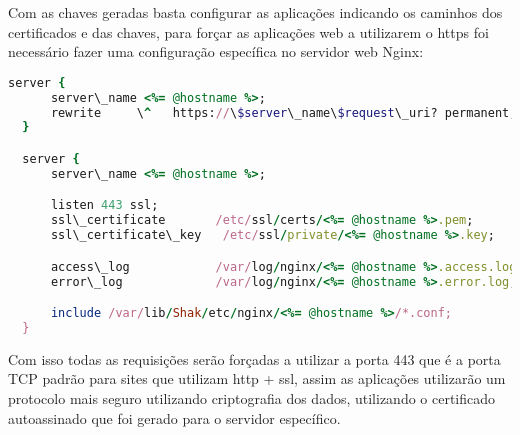Com as chaves geradas basta configurar as aplicações indicando os caminhos dos certificados
e das chaves, para forçar as aplicações web a utilizarem o https foi necessário fazer
uma configuração específica no servidor web Nginx:


\begin{lstlisting}[language=Ruby,label=dice_index,caption={Exemplo de arquivo de configuração do Nginx para aplicações web no shak}]
  server {
      server\_name <%= @hostname %>;
      rewrite     \^   https://\$server\_name\$request\_uri? permanent;
  }

  server {
      server\_name <%= @hostname %>;

      listen 443 ssl;
      ssl\_certificate       /etc/ssl/certs/<%= @hostname %>.pem;
      ssl\_certificate\_key   /etc/ssl/private/<%= @hostname %>.key;

      access\_log            /var/log/nginx/<%= @hostname %>.access.log;
      error\_log             /var/log/nginx/<%= @hostname %>.error.log;

      include /var/lib/Shak/etc/nginx/<%= @hostname %>/*.conf;
  }
\end{lstlisting}

Com isso todas as requisições serão forçadas a utilizar a porta 443 que é a porta
TCP padrão para sites que utilizam http + ssl, assim as aplicações utilizarão
um protocolo mais seguro utilizando criptografia dos dados, utilizando o
certificado autoassinado que foi gerado para o servidor específico.


